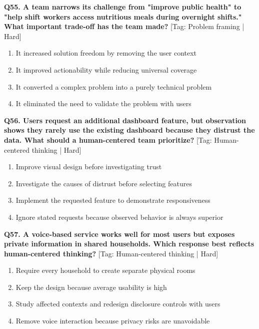 \noindent\textbf{Q55. A team narrows its challenge from "improve public health" to "help shift workers access nutritious meals during overnight shifts." What important trade-off has the team made?} \hfill [Tag: Problem framing | Hard]
\begin{enumerate}[label=(\alph*),topsep=2pt,itemsep=1pt,partopsep=0pt,parsep=0pt]
    \item {It increased solution freedom by removing the user context}
    \item {It improved actionability while reducing universal coverage}
    \item {It converted a complex problem into a purely technical problem}
    \item {It eliminated the need to validate the problem with users}
\end{enumerate}
\vspace{2mm}

\noindent\textbf{Q56. Users request an additional dashboard feature, but observation shows they rarely use the existing dashboard because they distrust the data. What should a human-centered team prioritize?} \hfill [Tag: Human-centered thinking | Hard]
\begin{enumerate}[label=(\alph*),topsep=2pt,itemsep=1pt,partopsep=0pt,parsep=0pt]
    \item {Improve visual design before investigating trust}
    \item {Investigate the causes of distrust before selecting features}
    \item {Implement the requested feature to demonstrate responsiveness}
    \item {Ignore stated requests because observed behavior is always superior}
\end{enumerate}
\vspace{2mm}

\noindent\textbf{Q57. A voice-based service works well for most users but exposes private information in shared households. Which response best reflects human-centered thinking?} \hfill [Tag: Human-centered thinking | Hard]
\begin{enumerate}[label=(\alph*),topsep=2pt,itemsep=1pt,partopsep=0pt,parsep=0pt]
    \item {Require every household to create separate physical rooms}
    \item {Keep the design because average usability is high}
    \item {Study affected contexts and redesign disclosure controls with users}
    \item {Remove voice interaction because privacy risks are unavoidable}
\end{enumerate}
\vspace{2mm}

